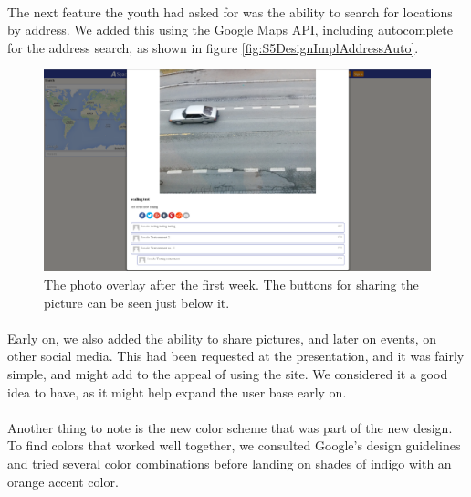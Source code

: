 \paragraph{} The next feature the youth had asked for was the ability to search for locations by address. We added this using the Google Maps API, including autocomplete for the address search, as shown in figure \ref{fig:S5DesignImplAddressAuto}.

\begin{figure}[ht!]
  \centering
  \includegraphics[width=\linewidth]{./img/webpage/27Oct/SinglePhoto27Oct}
  \caption{The photo overlay after the first week. The buttons for sharing the picture can be seen just below it.}
  \label{fig:S5DesignImplSinglePhoto27Oct}
\end{figure}

\paragraph{} Early on, we also added the ability to share pictures, and later on events, on other social media. This had been requested at the presentation, and it was fairly simple, and might add to the appeal of using the site. We considered it a good idea to have, as it might help expand the user base early on.

\paragraph{} Another thing to note is the new color scheme that was part of the new design. To find colors that worked well together, we consulted Google's design guidelines and tried several color combinations before landing on shades of indigo with an orange accent color.


